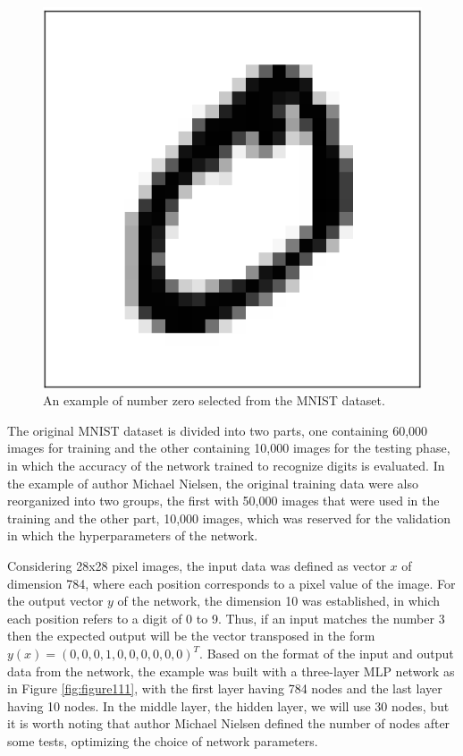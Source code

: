 \begin{figure}
    \centering
    \includegraphics[scale=0.5]{images/figure110.png}
    \caption{An example of number zero selected from the MNIST dataset.}
    \label{fig:figure110}
\end{figure}

The original MNIST dataset is divided into two parts, one containing 60,000 images for training and the other containing 10,000 images for the testing phase, in which the accuracy of the network trained to recognize digits is evaluated. In the example of author Michael Nielsen, the original training data were also reorganized into two groups, the first with 50,000 images that were used in the training and the other part, 10,000 images, which was reserved for the validation in which the hyperparameters of the network.

Considering 28x28 pixel images, the input data was defined as vector $x$ of dimension 784, where each position corresponds to a pixel value of the image. For the output vector $y$ of the network, the dimension 10 was established, in which each position refers to a digit of 0 to 9. Thus, if an input matches the number 3 then the expected output will be the vector transposed in the form $y(x)=(0,0,0,1,0,0,0,0,0,0)^T$. Based on the format of the input and output data from the network, the example was built with a three-layer MLP network as in Figure \ref{fig:figure111}, with the first layer having 784 nodes and the last layer having 10 nodes. In the middle layer, the hidden layer, we will use 30 nodes, but it is worth noting that author Michael Nielsen defined the number of nodes after some tests, optimizing the choice of network parameters.

